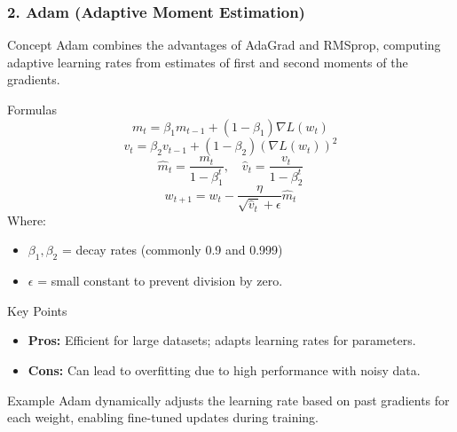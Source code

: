 \documentclass[aspectratio=169]{beamer}
\begin{document}
\begin{frame}[fragile]
    \frametitle{2. Adam (Adaptive Moment Estimation)}
    \begin{block}{Concept}
        Adam combines the advantages of AdaGrad and RMSprop, computing adaptive learning rates from estimates of first and second moments of the gradients.
    \end{block}
    
    \begin{block}{Formulas}
        \begin{equation}
            m_t = \beta_1 m_{t-1} + (1 - \beta_1)\nabla L(w_t)
        \end{equation}
        \begin{equation}
            v_t = \beta_2 v_{t-1} + (1 - \beta_2)(\nabla L(w_t))^2
        \end{equation}
        \begin{equation}
            \hat{m}_t = \frac{m_t}{1 - \beta_1^t}, \quad \hat{v}_t = \frac{v_t}{1 - \beta_2^t}
        \end{equation}
        \begin{equation}
            w_{t+1} = w_t - \frac{\eta}{\sqrt{\hat{v}_t} + \epsilon} \hat{m}_t
        \end{equation}
        Where:
        \begin{itemize}
            \item \(\beta_1, \beta_2\) = decay rates (commonly 0.9 and 0.999)
            \item \(\epsilon\) = small constant to prevent division by zero.
        \end{itemize}
    \end{block}
    
    \begin{block}{Key Points}
        \begin{itemize}
            \item \textbf{Pros:} Efficient for large datasets; adapts learning rates for parameters.
            \item \textbf{Cons:} Can lead to overfitting due to high performance with noisy data.
        \end{itemize}
    \end{block}
    
    \begin{block}{Example}
        Adam dynamically adjusts the learning rate based on past gradients for each weight, enabling fine-tuned updates during training.
    \end{block}
\end{frame}
\end{document}

